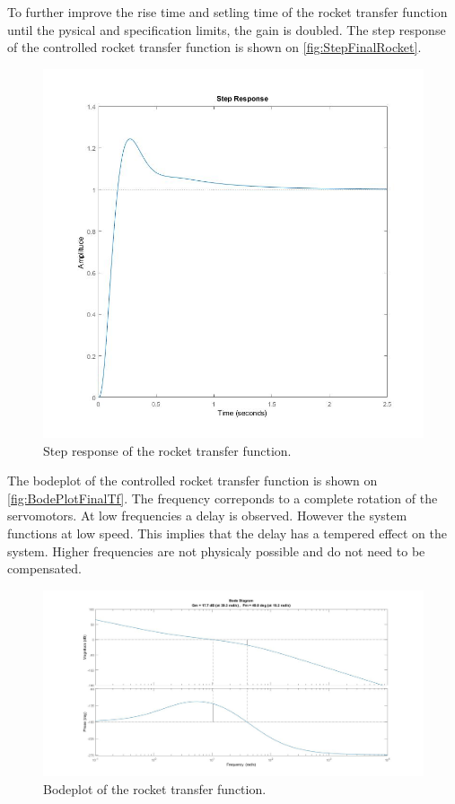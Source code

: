 To further improve the rise time and setling time of the rocket transfer function until the pysical and specification limits, the gain is doubled. 
The step response of the controlled rocket transfer function is shown on \autoref{fig:StepFinalRocket}.

\begin{figure}[htbp]
	\centering
	\includegraphics[width=\textwidth]{figures/Rocket/design/step_response_final}
	\caption{Step response of the rocket transfer function.}
	\label{fig:StepFinalRocket}
\end{figure}

The bodeplot of the controlled rocket transfer function is shown on \autoref{fig:BodePlotFinalTf}. The frequency correponds to a complete rotation of the servomotors. At low frequencies a delay is observed. However the system functions at low speed. This implies that the delay has a tempered effect on the system. Higher frequencies are not physicaly possible and do not need to be compensated.

\begin{figure}[htbp]
	\centering
		\includegraphics[width=\textwidth]{figures/Rocket/design/bodeplot}
		\caption{Bodeplot of the rocket transfer function.}
		\label{fig:BodeplotFinalTf}
\end{figure}

